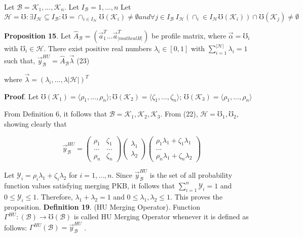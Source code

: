 \documentclass[10pt,a4paper]{IOS-Book-Article}
\begin{document}
Let  $\mathcal{B} = {\mathcal{K}_1, ...,\mathcal{K}_n}$. Let $I_\mathcal{B} = {1, ..., n} $
Let $\mathcal{H} = { \mho : \exists I_\mathcal{H} \subseteq I_\mathcal{B} : \mho = \cap_{i \in I_\mathcal{H}} \mho(\mathcal{K}_i) \neq \emptyset and \forall j \in I_\mathcal{B} \ I_\mathcal{H}(\cap_i\in I_\mathcal{H} \mho(\mathcal{K}_i)) \cap \mho(\mathcal{K}_j) \neq \emptyset }$

\textbf{Proposition 15}. Let $\hat{A}_\mathcal{B} = (\vec{a}^T_1 ...\vec{a}^T_|mathcal{H}|)$ be profile
matrix, where $\vec{\alpha} = \mho_i$ with $\mho_i \in \mathcal{H}$. There exist positive
real numbers $\lambda_i \in [0, 1]$ with $\sum^{|\mathcal{H}|}_{i=1} \lambda_i = 1$ such
that,
$\vec{y}^{HU}_\mathcal{B} = \hat{A}_\mathcal{B}\vec{\lambda}$ (23)

where $\vec{\lambda} = (\lambda_i, ..., \lambda|\mathcal{H}|)^T$

\textbf{Proof}. Let $\mho(\mathcal{K}_1)=\langle \rho_1, ..., \rho_n \rangle;\mho(\mathcal{K}_2)=\langle\zeta_1, ..., \zeta_n \rangle$;
$\mho(\mathcal{K}_3) = \langle\rho_1, ..., \rho_n\rangle$
 
From Definition 6, it follows that $\mathcal{B} = {\mathcal{K}_1,
\mathcal{K}_2,\mathcal{K}_3}$. From (22), $\mathcal{H} = {\mho_1,\mho_2}$, showing clearly
that

$$
\vec{y}^{HU}_\mathcal{B} =
\left( \begin{array}{cc}
\rho_1 &\zeta_1 \\
... &... \\
\rho_n &\zeta_n
\end{array} \right)
%
\left( \begin{array}{cc}
\lambda_1\\
\lambda_2
\end{array}
\right)
\left( \begin{array}{cc}
\rho_1\lambda_1 + \zeta_1\lambda_1\\
...\\
\rho_n\lambda_1 + \zeta_n\lambda_2
\end{array} \right)
$$

Let $\mathcal{Y}_i = \rho_i\lambda_1 + \zeta_i\lambda_2$ for $i = 1, ... , n$. Since $\vec{y}^{HU}_\mathcal{B}$
 is the set of all probability function values satisfying
merging PKB, it follows that $\sum^n_{i=1} \mathcal{Y}_i = 1$ and $0 \le 
\mathcal{Y}_i \le 1$. Therefore, $\lambda_1 + \lambda_2 = 1$ and $0 \le \lambda_1, \lambda_2 \le 1$.
 This proves the proposition.
\textbf{Definition 19}. (HU Merging Operator). Function
$\Gamma^{HU} : (\mathcal{B}) \to \mho(\mathcal{B})$ is called HU Merging Operator
whenever it is defined as follows: $\Gamma^{HU}(\mathcal{B}) = \vec{y}^{HU}_\mathcal{B}$ .
\end{document}
